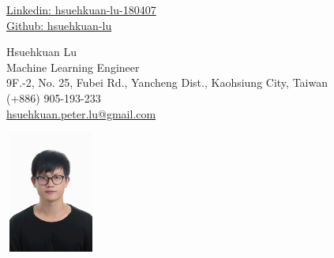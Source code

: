 \documentclass[a4,10pt]{article}
\begin{document}
\begin{center}
    \begin{minipage}[b]{0.24\textwidth}
            {\href{https://www.linkedin.com/in/hsuehkuan-lu-180407/}{Linkedin: hsuehkuan-lu-180407} } \\
            \href{https://github.com/hsuehkuan-lu}{Github: hsuehkuan-lu}
            
    \end{minipage}%
    \begin{minipage}[b]{0.5\textwidth}
            \centering
            {\HUGE Hsuehkuan Lu} \\ %
            \vspace{0.1cm}
            {\color{UI_blue} \Large{Machine Learning Engineer}} \\
            \large 9F.-2, No. 25, Fubei Rd., Yancheng Dist., Kaohsiung City, Taiwan \\
            \large (+886) 905-193-233 \\
            \large \href{mailto:hsuehkuan.peter.lu@gmail.com}{hsuehkuan.peter.lu@gmail.com} 
    \end{minipage}%
    \begin{minipage}[b]{0.24\textwidth}
            \flushright \large  %
            \includegraphics[width=3cm, height=4cm]{images/me.jpg}
    \end{minipage}   
    
\vspace{-0.15cm} 
{\color{UI_blue} \hrulefill}
\end{center}




\end{document}
